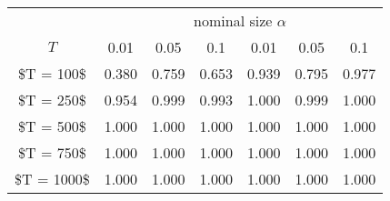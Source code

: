 % 
\begin{tabular}{ccccccc}
  \hline
  & \multicolumn{6}{c}{nominal size $\alpha$} \\
 $T$ & 0.01 & 0.05 & 0.1 & 0.01 & 0.05 & 0.1 \\
 \hline
\$T = 100\$ & 0.380 & 0.759 & 0.653 & 0.939 & 0.795 & 0.977 \\ 
  \$T = 250\$ & 0.954 & 0.999 & 0.993 & 1.000 & 0.999 & 1.000 \\ 
  \$T = 500\$ & 1.000 & 1.000 & 1.000 & 1.000 & 1.000 & 1.000 \\ 
  \$T = 750\$ & 1.000 & 1.000 & 1.000 & 1.000 & 1.000 & 1.000 \\ 
  \$T = 1000\$ & 1.000 & 1.000 & 1.000 & 1.000 & 1.000 & 1.000 \\ 
   \hline
\end{tabular}
